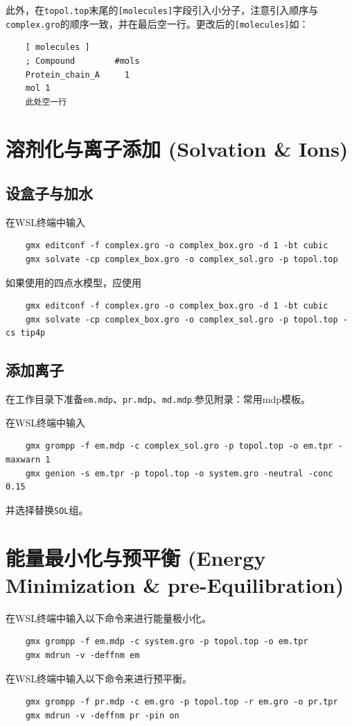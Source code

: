 \documentclass[UTF8, a4paper, 11pt]{ctexart}
\begin{document}
	此外，在\texttt{topol.top}末尾的\texttt{[molecules]}字段引入小分子，注意引入顺序与\texttt{complex.gro}的顺序一致，并在最后空一行。更改后的\texttt{[molecules]}如：
	\begin{lstlisting}
	[ molecules ]
	; Compound        #mols
	Protein_chain_A     1
	mol 1
	此处空一行
	\end{lstlisting}
	
	\section{溶剂化与离子添加 (Solvation \& Ions)}
	\subsection{设盒子与加水}
	在WSL终端中输入
	\begin{lstlisting}
	gmx editconf -f complex.gro -o complex_box.gro -d 1 -bt cubic
	gmx solvate -cp complex_box.gro -o complex_sol.gro -p topol.top
	\end{lstlisting}
	
	如果使用的四点水模型，应使用
	\begin{lstlisting}
	gmx editconf -f complex.gro -o complex_box.gro -d 1 -bt cubic
	gmx solvate -cp complex_box.gro -o complex_sol.gro -p topol.top -cs tip4p
	\end{lstlisting}
	
	\subsection{添加离子}
	在工作目录下准备\texttt{em.mdp}、\texttt{pr.mdp}、\texttt{md.mdp}.参见附录：常用mdp模板。
	
	在WSL终端中输入
	\begin{lstlisting}
	gmx grompp -f em.mdp -c complex_sol.gro -p topol.top -o em.tpr -maxwarn 1
	gmx genion -s em.tpr -p topol.top -o system.gro -neutral -conc 0.15
	\end{lstlisting}
	并选择替换\texttt{SOL}组。
	
	\section{能量最小化与预平衡 (Energy Minimization \& pre-Equilibration)}
	在WSL终端中输入以下命令来进行能量极小化。
	\begin{lstlisting}
	gmx grompp -f em.mdp -c system.gro -p topol.top -o em.tpr
	gmx mdrun -v -deffnm em
	\end{lstlisting}
	在WSL终端中输入以下命令来进行预平衡。
	\begin{lstlisting}
	gmx grompp -f pr.mdp -c em.gro -p topol.top -r em.gro -o pr.tpr
	gmx mdrun -v -deffnm pr -pin on
	\end{lstlisting}
	
\end{document}
